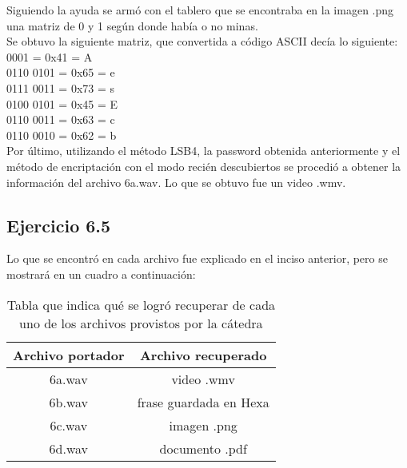 \documentclass{article}
\begin{document}
\noindent Siguiendo la ayuda se armó con el tablero que se encontraba en la imagen .png una matriz de 0 y 1 según donde había o no minas.\\
Se obtuvo la siguiente matriz, que convertida a código ASCII decía lo siguiente:\\

 0001 = 0x41 = A \\
0110 0101 = 0x65 = e \\
0111 0011 = 0x73 = s \\
0100 0101 = 0x45 = E \\
0110 0011 = 0x63 = c \\
0110 0010 = 0x62 = b \\

\noindent Por último, utilizando el método LSB4, la password obtenida anteriormente y el método de encriptación con el modo recién descubiertos se procedió a obtener la información del archivo 6a.wav. Lo que se obtuvo fue un video .wmv.

\subsection{Ejercicio 6.5}

Lo que se encontró en cada archivo fue explicado en el inciso anterior, pero se mostrará en un cuadro a continuación:

\begin{table}[H]
\begin{center}
\begin{tabular}{|c|c|}
\hline
Archivo portador & Archivo recuperado \\
\hline
\hline
6a.wav & video .wmv \\
\hline
6b.wav & frase guardada en Hexa\\
\hline
6c.wav & imagen .png \\
\hline  
6d.wav & documento .pdf \\
\hline  
\end{tabular}
\end{center}
\caption{Tabla que indica qué se logró recuperar de cada uno de los archivos provistos por la cátedra}
\label{found}
\end{table}
\end{document}
